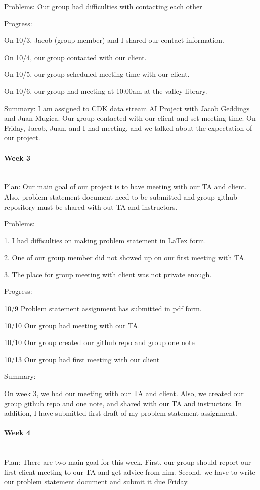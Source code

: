 \documentclass[article, onecolumn, draftclsnofoot,10pt, compsoc]{IEEEtran}
\begin{document}
Problems: Our group had difficulties with contacting each other

Progress: 

On 10/3, Jacob (group member) and I shared our contact information.

On 10/4, our group contacted with our client.

On 10/5, our group scheduled meeting time with our client.

On 10/6, our group had meeting at 10:00am at the valley library.

Summary: I am assigned to CDK data stream AI Project with Jacob Geddings and Juan Mugica. Our group contacted with our client and set meeting time. On Friday, Jacob, Juan, and I had meeting, and we talked about the expectation of our project.

\paragraph{Week 3}
\mbox{}\\
Plan: Our main goal of our project is to have meeting with our TA and client. Also, problem statement document need to be submitted and group github repository must be shared with out TA and instructors.

Problems: 

1.	I had difficulties on making problem statement in LaTex form.

2.	One of our group member did not showed up on our first meeting with TA.

3.	The place for group meeting with client was not private enough.

Progress: 

10/9 Problem statement assignment has submitted in pdf form.

10/10 Our group had meeting with our TA.

10/10 Our group created our github repo and group one note

10/13 Our group had first meeting with our client

Summary:

On week 3, we had our meeting with our TA and client. Also, we created our group github repo and one note, and shared with our TA and instructors. In addition, I have submitted first draft of my problem statement assignment.

\paragraph{Week 4}
\mbox{}\\
Plan: There are two main goal for this week. First, our group should report our first client meeting to our TA and get advice from him. Second, we have to write our problem statement document and submit it due Friday.
\end{document}
